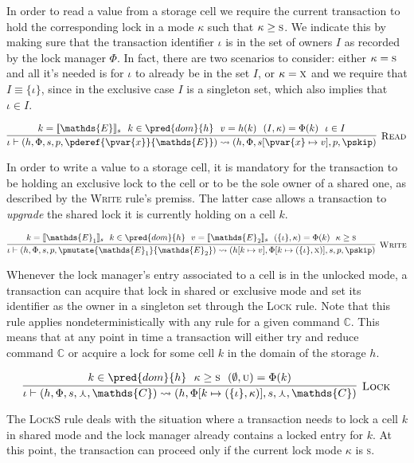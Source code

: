 In order to read a value from a storage cell we require the current transaction to hold the corresponding lock in a mode $\kappa$ such that $\kappa \geq \textsc{s}$. We indicate this by making sure that the transaction identifier $\iota$ is in the set of owners $I$ as recorded by the lock manager $\Phi$. In fact, there are two scenarios to consider: either $\kappa = \textsc{s}$ and all it's needed is for $\iota$ to already be in the set $I$, or $\kappa = \textsc{x}$ and we require that $I \equiv \{ \iota \}$, since in the exclusive case $I$ is a singleton set, which also implies that $\iota \in I$.

\[
\infer[\textsc{Read}]
{
	\iota \vdash (h, \Phi, s, p, \pderef{\pvar{x}}{\mathds{E}})
	\rightsquigarrow
	(h, \Phi, s[\pvar{x} \mapsto v], p, \pskip)
}
{
	k = \llbracket \mathds{E} \rrbracket_s\ \
	k \in \pred{dom}{h}\ \
	v = h(k)\ \
	(I, \kappa) = \Phi(k)\ \
	\iota \in I
}
\]

In order to write a value to a storage cell, it is mandatory for the transaction to be holding an exclusive lock to the cell or to be the sole owner of a shared one, as described by the \textsc{Write} rule's premiss. The latter case allows a transaction to \textit{upgrade} the shared lock it is currently holding on a cell $k$.

\[
\infer[\textsc{Write}]
{
	\iota \vdash (h, \Phi, s, p, \pmutate{\mathds{E}_1}{\mathds{E}_2})
	\rightsquigarrow
	(h[k \mapsto v], \Phi[k \mapsto (\{\iota\}, \textsc{x})], s, p, \pskip)
}
{
	k = \llbracket \mathds{E}_1 \rrbracket_s\ \
	k \in \pred{dom}{h}\ \
	v = \llbracket \mathds{E}_2 \rrbracket_s\ \
	(\{ \iota \}, \kappa) = \Phi(k)\ \
	\kappa \geq \textsc{s}
}
\]

Whenever the lock manager's entry associated to a cell is in the unlocked mode, a transaction can acquire that lock in shared or exclusive mode and set its identifier as the owner in a singleton set through the \textsc{Lock} rule. Note that this rule applies nondeterministically with any rule for a given command $\mathds{C}$. This means that at any point in time a transaction will either try and reduce command $\mathds{C}$ or acquire a lock for some cell $k$ in the domain of the storage $h$.

\[
\infer[\textsc{Lock}]
{
	\iota \vdash (h, \Phi, s, \curlywedge, \mathds{C})
	\rightsquigarrow
	(h, \Phi[k \mapsto (\{\iota\}, \kappa)], s, \curlywedge, \mathds{C})
}
{
	k \in \pred{dom}{h}\ \
	\kappa \geq \textsc{s}\ \
	(\emptyset, \textsc{u}) = \Phi(k)
}
\]

The \textsc{LockS} rule deals with the situation where a transaction needs to lock a cell $k$ in shared mode and the lock manager already contains a locked entry for $k$. At this point, the transaction can proceed only if the current lock mode $\kappa$ is \textsc{s}.

